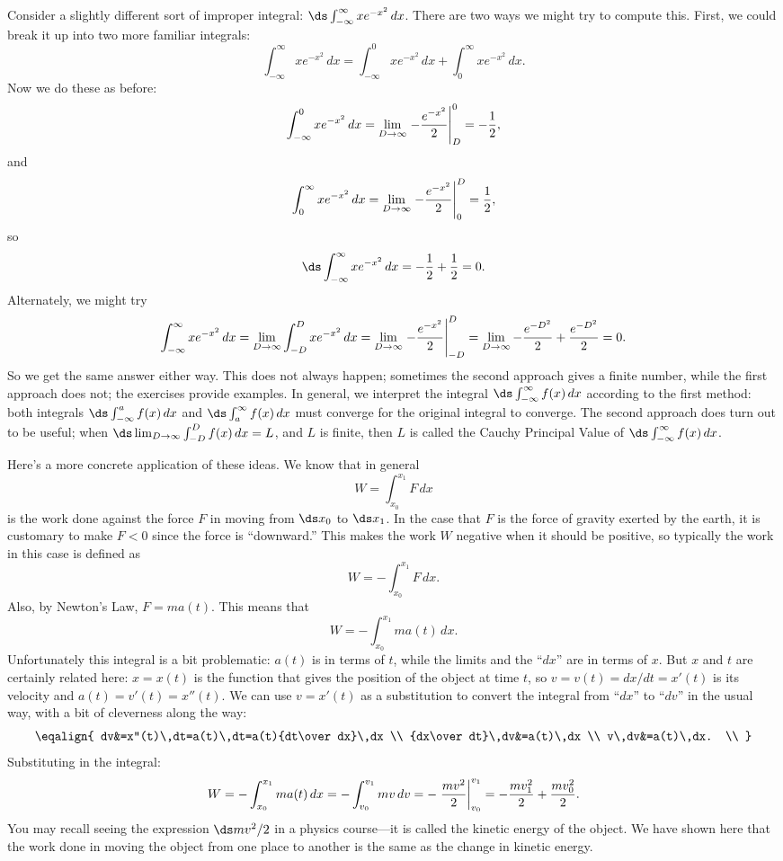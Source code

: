 Consider a slightly different sort of improper integral:
$\ds \int_{-\infty}^\infty xe^{-x^2}\,dx$. There are two ways we might
try to compute this. First, we could break it up into two more
familiar integrals:
$$
  \int_{-\infty}^\infty xe^{-x^2}\,dx=
  \int_{-\infty}^0 xe^{-x^2}\,dx+\int_{0}^\infty xe^{-x^2}\,dx.
$$
Now we do these as before:
$$
  \int_{-\infty}^0 xe^{-x^2}\,dx=\lim_{D\to\infty}
  \left.-{e^{-x^2}\over2}\right|_D^0=-{1\over2},
$$
and
$$
  \int_0^\infty xe^{-x^2}\,dx=\lim_{D\to\infty}
  \left.-{e^{-x^2}\over2}\right|_0^D={1\over2},
$$
so 
$$\ds \int_{-\infty}^\infty xe^{-x^2}\,dx=-{1\over2}+{1\over2}=0.$$
Alternately, we might try
$$
  \int_{-\infty}^\infty xe^{-x^2}\,dx=
  \lim_{D\to\infty}\int_{-D}^D xe^{-x^2}\,dx=
  \lim_{D\to\infty}\left.-{e^{-x^2}\over2}\right|_{-D}^D=
  \lim_{D\to\infty} -{e^{-D^2}\over2}+{e^{-D^2}\over2}=0.
$$
So we get the same answer either way. This does not always happen;
sometimes the second approach gives a finite number, while the first
approach does not; the exercises provide examples. In general, we
interpret the integral $\ds\int_{-\infty}^\infty f(x)\,dx$ according
to the first method: both integrals $\ds\int_{-\infty}^a
f(x)\,dx$ and $\ds\int_{a}^\infty f(x)\,dx$ must converge for the
original integral to converge. The second approach does turn out to be
useful; when $\ds\lim_{D\to\infty}\int_{-D}^D f(x)\,dx=L$, and $L$ is
finite, then $L$ is called the 
{\dfont Cauchy Principal Value\/} of
$\ds\int_{-\infty}^\infty f(x)\,dx$.

Here's a more concrete application of these ideas. We know that
in general
$$W=\int_{x_0}^{x_1} F\,dx$$ 
is the work done against the force $F$ in moving from $\ds x_0$ to
$\ds x_1$. In the case that $F$ is the force of gravity exerted by the
earth, it is customary to make $F<0$ since the force is ``downward.''
This makes the work $W$ negative when it should be positive, so
typically the work in this case is defined as
$$W=-\int_{x_0}^{x_1} F\,dx.$$
Also, by Newton's Law, $F=ma(t)$. This means that 
$$W=-\int_{x_0}^{x_1} ma(t)\,dx.$$
Unfortunately this integral is a bit problematic: $a(t)$ is in terms
of $t$, while the limits and the ``$dx$'' are in terms of $x$. But $x$
and $t$ are certainly related here: $x=x(t)$ is the function that
gives the position of the object at time $t$, so $v=v(t)=dx/dt=x'(t)$
is its velocity and $a(t)=v'(t)=x''(t)$. We can use $v=x'(t)$ as a
substitution to convert the integral from ``$dx$'' to ``$dv$'' in the
usual way, with a bit of cleverness along the way:
$$\eqalign{
  dv&=x''(t)\,dt=a(t)\,dt=a(t){dt\over dx}\,dx \\
  {dx\over dt}\,dv&=a(t)\,dx \\
  v\,dv&=a(t)\,dx. \\
}$$ 
Substituting in the integral:
$$
  W=-\int_{x_0}^{x_1} ma(t)\,dx=-\int_{v_0}^{v_1} mv\,dv=
  -\left.{mv^2\over2}\right|_{v_0}^{v_1}=-{mv_1^2\over2}+{mv_0^2\over2}.
$$
You may recall seeing the expression $\ds mv^2/2$ in a physics course---it
is called the {\dfont kinetic energy\/} of the
object. We have shown here that the work done in moving the object
from one place to another is the same as the change in kinetic energy.

